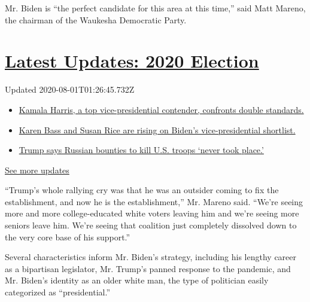 Mr. Biden is ``the perfect candidate for this area at this time,'' said
Matt Mareno, the chairman of the Waukesha Democratic Party.

\hypertarget{latest-updates-2020-election}{%
\section{\texorpdfstring{\href{https://www.nytimes.com/2020/07/31/us/elections/biden-vs-trump.html?action=click\&pgtype=Article\&state=default\&region=MAIN_CONTENT_1\&context=storylines_live_updates}{Latest
Updates: 2020
Election}}{Latest Updates: 2020 Election}}\label{latest-updates-2020-election}}

Updated 2020-08-01T01:26:45.732Z

\begin{itemize}
\tightlist
\item
  \href{https://www.nytimes.com/2020/07/31/us/elections/biden-vs-trump.html?action=click\&pgtype=Article\&state=default\&region=MAIN_CONTENT_1\&context=storylines_live_updates\#link-29fdff45}{Kamala
  Harris, a top vice-presidential contender, confronts double
  standards.}
\item
  \href{https://www.nytimes.com/2020/07/31/us/elections/biden-vs-trump.html?action=click\&pgtype=Article\&state=default\&region=MAIN_CONTENT_1\&context=storylines_live_updates\#link-13ec3d9c}{Karen
  Bass and Susan Rice are rising on Biden's vice-presidential
  shortlist.}
\item
  \href{https://www.nytimes.com/2020/07/31/us/elections/biden-vs-trump.html?action=click\&pgtype=Article\&state=default\&region=MAIN_CONTENT_1\&context=storylines_live_updates\#link-49e9a016}{Trump
  says Russian bounties to kill U.S. troops `never took place.'}
\end{itemize}

\href{https://www.nytimes.com/2020/07/31/us/elections/biden-vs-trump.html?action=click\&pgtype=Article\&state=default\&region=MAIN_CONTENT_1\&context=storylines_live_updates}{See
more updates}

``Trump's whole rallying cry was that he was an outsider coming to fix
the establishment, and now he is the establishment,'' Mr. Mareno said.
``We're seeing more and more college-educated white voters leaving him
and we're seeing more seniors leave him. We're seeing that coalition
just completely dissolved down to the very core base of his support.''

Several characteristics inform Mr. Biden's strategy, including his
lengthy career as a bipartisan legislator, Mr. Trump's panned response
to the pandemic, and Mr. Biden's identity as an older white man, the
type of politician easily categorized as ``presidential.''


